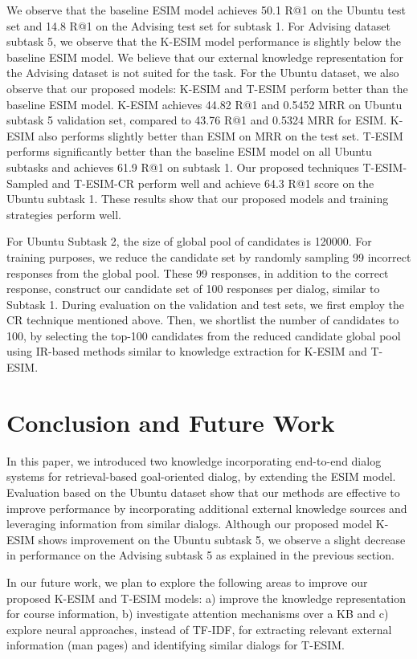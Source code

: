 \documentclass[letterpaper]{article} %
\begin{document}
We observe that the baseline ESIM model achieves 50.1 R@1 on the Ubuntu test set and 14.8 R@1 on the Advising test set for subtask 1. For Advising dataset subtask 5, we observe that the K-ESIM model performance is slightly below the baseline ESIM model. We believe that our external knowledge representation for the Advising dataset is not suited for the task. For the Ubuntu dataset, we also observe that our proposed models: K-ESIM and T-ESIM perform better than the baseline ESIM model. K-ESIM achieves 44.82 R@1 and 0.5452 MRR on Ubuntu subtask 5 validation set, compared to 43.76 R@1 and 0.5324 MRR for ESIM. K-ESIM also performs slightly better than ESIM on MRR on the test set. T-ESIM performs significantly better than the baseline ESIM model on all Ubuntu subtasks and achieves 61.9 R@1 on subtask 1. Our proposed techniques T-ESIM-Sampled and T-ESIM-CR perform well and achieve 64.3 R@1 score on the Ubuntu subtask 1. These results show that our proposed models and training strategies perform well.

For Ubuntu Subtask 2, the size of global pool of candidates is 120000. For training purposes, we reduce the candidate set by randomly sampling 99 incorrect responses from the global pool. These 99 responses, in addition to the correct response, construct our candidate set of 100 responses per dialog, similar to Subtask 1. During evaluation on the validation and test sets, we first employ the CR technique mentioned above. Then, we shortlist the number of candidates to 100, by selecting the top-100 candidates from the reduced candidate global pool using IR-based methods similar to knowledge extraction for K-ESIM and T-ESIM.

\vspace{-3.52mm}
\section{Conclusion and Future Work}
In this paper, we introduced two knowledge incorporating end-to-end dialog systems for retrieval-based goal-oriented dialog, by extending the ESIM model. Evaluation based on the Ubuntu dataset show that our methods are effective to improve performance by incorporating additional external knowledge sources and leveraging information from similar dialogs. Although our proposed model K-ESIM shows improvement on the Ubuntu subtask 5, we observe a slight decrease in performance on the Advising subtask 5 as explained in the previous section.

In our future work, we plan to explore the following areas to improve our proposed K-ESIM and T-ESIM models: a) improve the knowledge representation for course information, b) investigate attention mechanisms over a KB \cite{eric2017key} and c) explore neural approaches, instead of TF-IDF, for extracting relevant external information (man pages) and identifying similar dialogs for T-ESIM.
\end{document}
